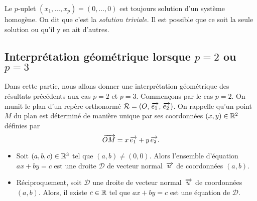 \documentclass{magnoliaold}
\begin{document}
\begin{remarqueUnique}
\remarque Le $p$-uplet $(x_1,\ldots,x_p)=(0,\ldots,0)$ est toujours solution d'un système homogène. On dit
  que c'est la \emph{solution triviale}. Il est possible que ce soit la seule solution
  ou qu'il y en ait d'autres.
\end{remarqueUnique}





\subsection{Interprétation géométrique lorsque $p=2$ ou $p=3$}

Dans cette partie, nous allons donner une interprétation géométrique des résultats précédents aux cas $p=2$ et $p=3$. Commençons par le cas $p=2$. On munit le plan d'un repère orthonormé $\mathcal{R}=(O,\kern 2pt\overrightarrow{\kern -2pte_1},\kern 2pt\overrightarrow{\kern -2pte_2})$. On rappelle qu'un point $M$ du plan est déterminé de manière unique par ses coordonnées $(x,y)\in\mathbb{R}^2$ définies par \[\kern 2pt\overrightarrow{\kern -2ptOM}=x\kern 2pt\overrightarrow{\kern -2pte_1}+y\kern 2pt\overrightarrow{\kern -2pte_2}.\]

\begin{proposition}
\begin{itemize}
\item Soit $(a,b,c)\in\mathbb{R}^3$ tel que $(a,b)\neq(0,0)$. Alors l'ensemble d'équation $ax+by=c$ est une droite $\mathcal{D}$ de vecteur normal $\kern 2pt\overrightarrow{\kern -2ptu}$ de coordonnées $(a,b)$.
\item Réciproquement, soit $\mathcal{D}$ une droite de vecteur normal $\kern 2pt\overrightarrow{\kern -2ptu}$ de coordonnées $(a,b)$. Alors, il existe $c\in\mathbb{R}$ tel que $ax+by=c$ est une équation de $\mathcal{D}$.
\end{itemize}
\end{proposition}
\end{document}
